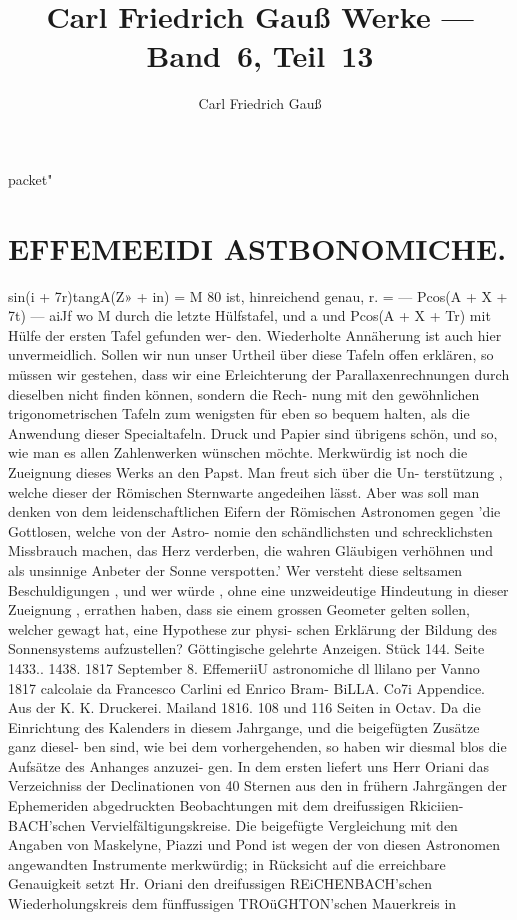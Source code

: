 \documentclass[12pt,a4paper]{article}
\title{Carl Friedrich Gau\ss{} Werke --- Band~6, Teil~13}
\author{Carl Friedrich Gau\ss{}}
\date{}
\begin{document}
\shortsource packet{"}
\maketitle
\thispagestyle{fancy}


\section*{EFFEMEEIDI  ASTBONOMICHE.}

sin(i  +  7r)tangA(Z»  +  in)  =  M 80  ist,  hinreichend  genau, r.  =  ---  Pcos(A  +  X  +  7t)  --- aiJf wo  M  durch  die  letzte  Hülfstafel,  und  a  und  Pcos(A  +  X  +  Tr)  mit  Hülfe  der  ersten  Tafel  gefunden  wer- den.    Wiederholte  Annäherung  ist  auch  hier  unvermeidlich. Sollen  wir  nun  unser  Urtheil  über  diese  Tafeln  offen  erklären,  so  müssen  wir  gestehen,  dass  wir eine  Erleichterung  der  Parallaxenrechnungen  durch  dieselben  nicht  finden  können,  sondern  die  Rech- nung mit  den  gewöhnlichen  trigonometrischen  Tafeln  zum  wenigsten  für  eben  so  bequem  halten,  als  die Anwendung  dieser  Specialtafeln.  Druck  und  Papier  sind  übrigens  schön,  und  so,  wie  man  es  allen Zahlenwerken  wünschen  möchte. Merkwürdig  ist  noch  die  Zueignung  dieses  Werks  an  den  Papst.  Man  freut  sich  über  die  Un- terstützung ,  welche  dieser  der  Römischen  Sternwarte  angedeihen  lässt.  Aber  was  soll  man  denken  von dem  leidenschaftlichen  Eifern  der  Römischen  Astronomen  gegen  'die  Gottlosen,  welche  von  der  Astro- nomie den  schändlichsten  und  schrecklichsten  Missbrauch  machen,  das  Herz  verderben,  die  wahren Gläubigen  verhöhnen  und  als  unsinnige  Anbeter  der  Sonne  verspotten.'  Wer  versteht  diese  seltsamen Beschuldigungen ,  und  wer  würde ,  ohne  eine  unzweideutige  Hindeutung  in  dieser  Zueignung ,  errathen haben,  dass  sie  einem  grossen  Geometer  gelten  sollen,  welcher  gewagt  hat,  eine  Hypothese  zur  physi- schen Erklärung  der  Bildung  des  Sonnensystems  aufzustellen? Göttingische  gelehrte  Anzeigen.     Stück  144.     Seite  1433..  1438.     1817  September  8. EffemeriiU  astronomiche  dl  llilano  per  Vanno  1817  calcolaie  da  Francesco  Carlini  ed  Enrico  Bram- BiLLA.     Co7i  Appendice.     Aus  der  K.  K.  Druckerei.     Mailand  1816.     108  und  116  Seiten  in  Octav. Da  die  Einrichtung  des  Kalenders  in  diesem  Jahrgange,  und  die  beigefügten  Zusätze  ganz  diesel- ben sind,  wie  bei  dem  vorhergehenden,  so  haben  wir  diesmal  blos  die  Aufsätze  des  Anhanges  anzuzei- gen. In  dem  ersten  liefert  uns  Herr  Oriani  das  Verzeichniss  der  Declinationen  von  40  Sternen  aus  den in  frühern  Jahrgängen  der  Ephemeriden  abgedruckten  Beobachtungen  mit  dem  dreifussigen  Rkiciien- BACH'schen  Vervielfältigungskreise.  Die  beigefügte  Vergleichung  mit  den  Angaben  von  Maskelyne,  Piazzi und  Pond  ist  wegen  der  von  diesen  Astronomen  angewandten  Instrumente  merkwürdig;  in  Rücksicht auf  die  erreichbare  Genauigkeit  setzt  Hr.  Oriani  den  dreifussigen  REiCHENBACH'schen  Wiederholungskreis dem  fünffussigen  TROüGHTON'schen  Mauerkreis  in  
\end{document}
